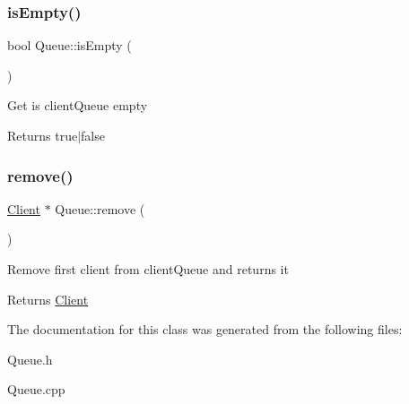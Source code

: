 \subsubsection{\texorpdfstring{is\+Empty()}{isEmpty()}}
{\footnotesize\ttfamily bool Queue\+::is\+Empty (\begin{DoxyParamCaption}{ }\end{DoxyParamCaption})}

Get is client\+Queue empty \begin{DoxyReturn}{Returns}
true$\vert$false 
\end{DoxyReturn}
\mbox{\label{classQueue_a2767e32f2c7f51eedf0b75af9d944f67}} 
\subsubsection{\texorpdfstring{remove()}{remove()}}
{\footnotesize\ttfamily \hyperlink{classClient}{Client} $\ast$ Queue\+::remove (\begin{DoxyParamCaption}{ }\end{DoxyParamCaption})}

Remove first client from client\+Queue and returns it \begin{DoxyReturn}{Returns}
\hyperlink{classClient}{Client} 
\end{DoxyReturn}


The documentation for this class was generated from the following files\+:\begin{DoxyCompactItemize}
\item 
Queue.\+h\item 
Queue.\+cpp\end{DoxyCompactItemize}

